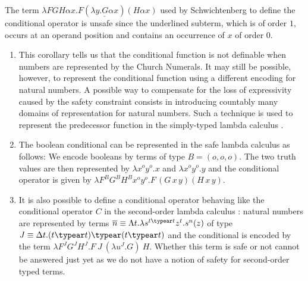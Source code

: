 \begin{example}
The term $\lambda F G H \alpha x . F ( \underline{\lambda y . G
\alpha x} ) (H \alpha x)$ used by Schwichtenberg
\cite{citeulike:622637} to define the conditional operator is unsafe
since the underlined subterm, which is of order $1$, occurs at an
operand position and contains an occurrence of $x$ of order $0$.
\end{example}

\begin{remark} \hfill
\begin{enumerate}
\item This corollary tells us that the conditional function is not
definable when numbers are represented by the Church Numerals.
It may still be possible, however, to represent the conditional
function using a different encoding for natural numbers. A
possible way to compensate for the loss of expressivity caused
by the safety constraint consists in introducing countably many
domains of representation for natural numbers. Such
a technique is used to represent the predecessor function in
the simply-typed lambda calculus
\cite{DBLP:journals/jacm/FortuneLO83}.

\item The boolean conditional can be represented in the safe
lambda calculus as follows: We encode booleans by terms of type
$B=(o,o,o)$. The two truth values are then represented by
$\lambda x^o y^o.x$ and $\lambda x^o y^o.y$ and the conditional operator is given by $\lambda F^B G^B H^B x^o y^o. F\,(G\,x\,y) (H\,x\,y)$.

\item It is also possible to define a conditional operator behaving like
the conditional operator $C$ in the second-order lambda calculus
\cite{DBLP:journals/jacm/FortuneLO83}: natural numbers are
represented by terms $\overline{n} \equiv \Lambda t.\lambda
s^{t\typear t} z^t.s^n(z)$ of type $J \equiv \Delta t.(t\typear
t) \typear (t \typear t)$ and the conditional is encoded by the
term $\lambda F^J G^J H^J.F~J~(\lambda u^J . G)~H$. Whether this
term is safe or not cannot be answered just yet as we do not
have a notion of safety for second-order typed terms.
\end{enumerate}
\end{remark}





\newcommand{\zaioncencode}{\underline} %


